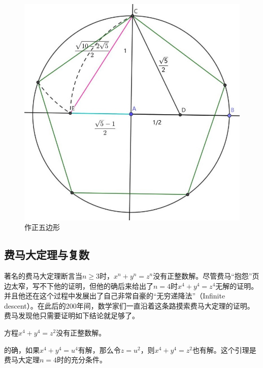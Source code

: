 \documentclass[b5paper]{ctexart}
\begin{document}
\begin{figure}[htbp]
 \centering
 \includegraphics[scale=0.3]{img/pentagon-cons}
 \caption{作正五边形}
 \label{fig:pentagon-cons}
\end{figure}

\subsection{费马大定理与复数}

著名的费马大定理断言当$n \geq 3$时，$x^n + y^n = z^n$没有正整数解。尽管费马“抱怨”页边太窄，写不下他的证明，但他的确后来给出了$n=4$时$x^4 + y^4 = z^4$无解的证明。并且他还在这个过程中发展出了自己非常自豪的“无穷递降法”（Infinite descent）。在此后的200年间，数学家们一直沿着这条路摸索费马大定理的证明。费马发现他只需要证明如下结论就足够了。

\begin{lemma}
方程$x^4 + y^4 = z^2$没有正整数解。
\end{lemma}

的确，如果$x^4 + y^4 = u^4$有解，那么令$z = u^2$，则$x^4 + y^4 = z^2$也有解。这个引理是费马大定理$n = 4$时的充分条件。
\end{document}
